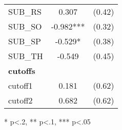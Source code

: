 \begin{table}[htb]
\begin{threeparttable}
\begin{tabular}{l c c}
      SUB\_RS                               & 0.307                  & (0.42)               \\
      SUB\_SO                               & -0.982***              & (0.32)               \\
      SUB\_SP                               & -0.529*                & (0.38)               \\
      SUB\_TH                               & -0.549                 & (0.45)               \\
      \hline
      \textbf{cutoffs}                      &                        &                      \\           
      cutoff1                               & 0.181                  & (0.62)               \\
      cutoff2                               & 0.682                  & (0.62)               \\
      \hline
      \hline
    \end{tabular}
    \begin{tablenotes}
    \item{* p<.2, ** p<.1, *** p<.05}
    \end{tablenotes}
  \end{threeparttable}
\end{table}

\clearpage{}

\newpage{}

